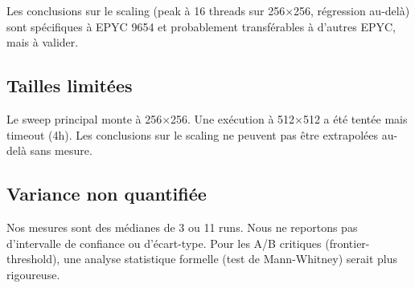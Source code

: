 Les conclusions sur le scaling (peak à 16 threads sur 256×256, régression au-delà) sont spécifiques à EPYC 9654 et probablement transférables à d'autres EPYC, mais à valider.

\subsection{Tailles limitées}

Le sweep principal monte à 256×256. Une exécution à 512×512 a été tentée mais timeout (4h). Les conclusions sur le scaling ne peuvent pas être extrapolées au-delà sans mesure.

\subsection{Variance non quantifiée}

Nos mesures sont des médianes de 3 ou 11 runs. Nous ne reportons pas d'intervalle de confiance ou d'écart-type. Pour les A/B critiques (frontier-threshold), une analyse statistique formelle (test de Mann-Whitney) serait plus rigoureuse.

